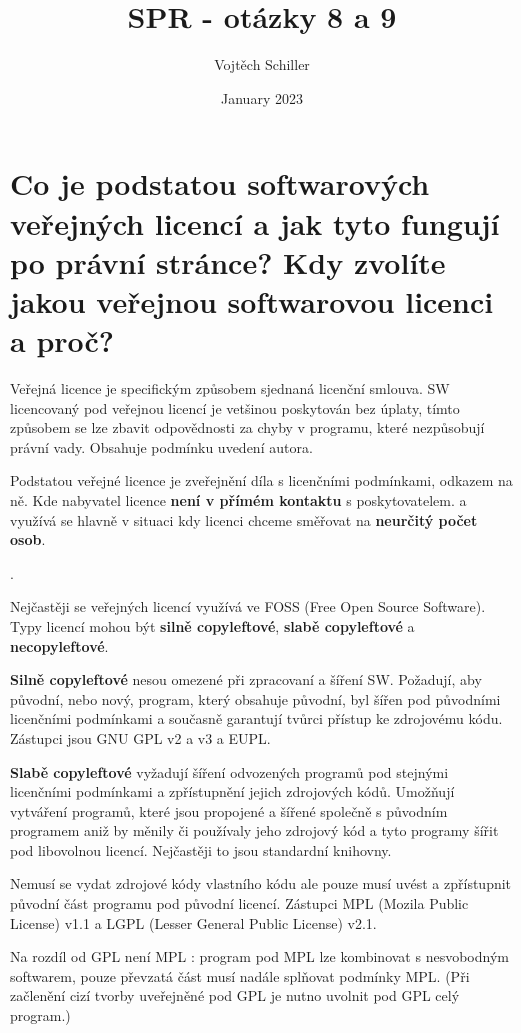 \documentclass{article}
\title{SPR - otázky 8 a 9}
\author{Vojtěch Schiller}
\date{January 2023}
\begin{document}
\maketitle

\section{Co je podstatou softwarových veřejných licencí a jak tyto fungují po právní stránce? Kdy zvolíte jakou veřejnou softwarovou licenci a proč?}

Veřejná licence je specifickým způsobem sjednaná licenční smlouva. SW licencovaný pod veřejnou licencí je vetšinou poskytován bez úplaty, tímto způsobem se lze zbavit odpovědnosti za chyby v programu, které nezpůsobují právní vady. Obsahuje podmínku uvedení autora.

Podstatou veřejné licence je zveřejnění díla s licenčními podmínkami, odkazem na ně. Kde
nabyvatel licence \textbf{není v přímém kontaktu} s poskytovatelem. a využívá se hlavně v situaci
kdy licenci chceme směřovat na \textbf{neurčitý počet osob}.

.

Nejčastěji se veřejných licencí využívá ve FOSS (Free Open Source Software). Typy licencí mohou být \textbf{silně copyleftové},
\textbf{slabě copyleftové} a \textbf{necopyleftové}.

\textbf{Silně copyleftové} nesou omezené při zpracovaní a šíření SW. Požadují, aby původní,
nebo nový, program, který obsahuje původní, byl šířen pod původními licenčními podmínkami a současně garantují tvůrci přístup ke zdrojovému kódu. Zástupci jsou GNU GPL v2 a v3 a EUPL.

\textbf{Slabě copyleftové} vyžadují šíření odvozených programů pod stejnými licenčními podmínkami a zpřístupnění jejich zdrojových kódů. Umožňují vytváření programů, které jsou
propojené a šířené společně s původním programem aniž by měnily či používaly jeho
zdrojový kód a tyto programy šířit pod libovolnou licencí. Nejčastěji to jsou standardní
knihovny. 

Nemusí se vydat zdrojové kódy vlastního kódu ale pouze musí uvést a zpřístupnit původní část programu pod původní licencí. Zástupci MPL (Mozila Public License) v1.1 a LGPL (Lesser General Public License) v2.1.

Na rozdíl od GPL není MPL : program pod MPL lze kombinovat s nesvobodným softwarem, pouze převzatá část musí nadále splňovat podmínky MPL. (Při začlenění cizí tvorby uveřejněné pod GPL je nutno uvolnit pod GPL celý program.)
\end{document}
